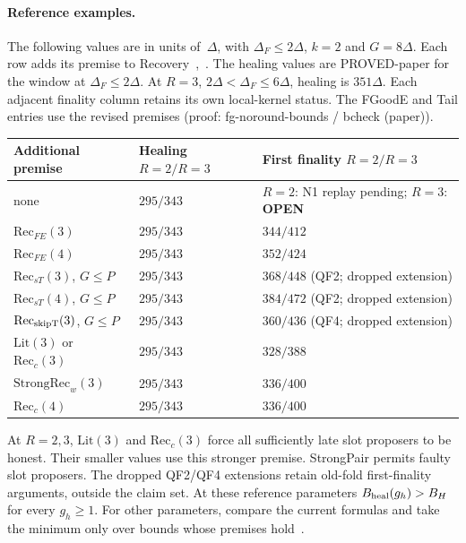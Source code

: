 \documentclass{article}
\theoremstyle{plain}
\theoremstyle{definition}
\theoremstyle{remark}
\newcommand{\OPEN}{\textbf{OPEN}}
\begin{document}
\paragraph{Reference examples.}  The following values are in units
of~$\Delta$, with $\Delta_F\leq2\Delta$, $k=2$ and $G=8\Delta$.  Each row adds its premise
to Recovery~\cite[\S2.5]{BPO},~\cite[B1]{BPF}.
The healing values are PROVED-paper for the window at $\Delta_F\leq2\Delta$.
At $R=3$, $2\Delta<\Delta_F\leq6\Delta$, healing is $351\Delta$.
Each adjacent finality column retains its own local-kernel status.
The FGoodE and Tail entries use the revised premises
(proof: fg-noround-bounds / bcheck (paper)).
\begin{center}
\footnotesize
\begin{tabular}{lll}
\hline
Additional premise & Healing $R=2/R=3$ & First finality $R=2/R=3$\\
\hline
none & $295/343$ & $R=2$: N1 replay pending; $R=3$: \OPEN{}\\
$\mathrm{Rec}_{FE}(3)$ & $295/343$ & $344/412$\\
$\mathrm{Rec}_{FE}(4)$ & $295/343$ & $352/424$\\
$\mathrm{Rec}_{sT}(3)$, $G\leq P$ & $295/343$ & $368/448$ (QF2; dropped extension)\\
$\mathrm{Rec}_{sT}(4)$, $G\leq P$ & $295/343$ & $384/472$ (QF2; dropped extension)\\
$\mathrm{Rec}_{\rm skipT}(3)$, $G\leq P$ & $295/343$ & $360/436$ (QF4; dropped extension)\\
$\mathrm{Lit}(3)$ or $\mathrm{Rec}_{c}(3)$ & $295/343$ & $328/388$\\
$\mathrm{StrongRec}_{w}(3)$ & $295/343$ & $336/400$\\
$\mathrm{Rec}_{c}(4)$ & $295/343$ & $336/400$\\
\hline
\end{tabular}
\end{center}
At $R=2,3$, $\mathrm{Lit}(3)$ and $\mathrm{Rec}_{c}(3)$ force
all sufficiently late slot proposers to be honest.  Their smaller
values use this stronger premise.  StrongPair permits faulty slot
proposers.  The dropped QF2/QF4 extensions retain old-fold first-finality arguments, outside the claim set.
At these reference parameters $B_{\rm heal}(g_h)>B_H$ for every
$g_h\geq1$.  For other parameters, compare the current formulas and
take the minimum only over bounds whose premises hold~\cite[\S9]{BPH}.
\end{document}

